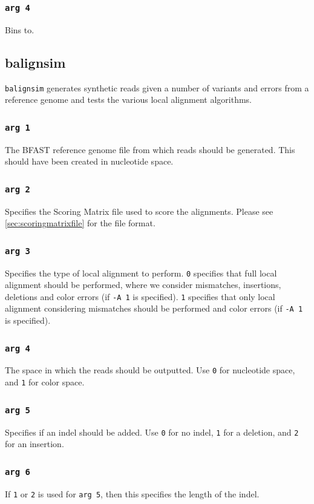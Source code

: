 \documentclass[a4paper,12pt]{book}
\newcommand{\TT}[1]{{\tt #1}} %
\newcommand{\BRGF}{BFAST reference genome file} %
\begin{document}
\subsubsection{\TT{arg 4}}
Bins to.
\subsection{balignsim}
\label{sec:balignsim}
\TT{balignsim} generates synthetic reads given a number of variants and errors from a reference genome and tests the various local alignment algorithms.

\subsubsection{\TT{arg 1}}
The \BRGF{} from which reads should be generated.
This should have been created in nucleotide space.
\subsubsection{\TT{arg 2}}
Specifies the Scoring Matrix file used to score the alignments.
Please see \autoref{sec:scoringmatrixfile} for the file format.
\subsubsection{\TT{arg 3}}
Specifies the type of local alignment to perform.
\TT{0} specifies that full local alignment should be performed, where we consider mismatches, insertions, deletions and color errors (if \TT{-A 1} is specified).
\TT{1} specifies that only local alignment considering mismatches should be performed and color errors (if \TT{-A 1} is specified).
\subsubsection{\TT{arg 4}}
The space in which the reads should be outputted.
Use \TT{0} for nucleotide space, and \TT{1} for color space.
\subsubsection{\TT{arg 5}}
Specifies if an indel should be added.
Use \TT{0} for no indel, \TT{1} for a deletion, and \TT{2} for an insertion.
\subsubsection{\TT{arg 6}}
If \TT{1} or \TT{2} is used for \TT{arg 5}, then this specifies the length of the indel.
\end{document}
